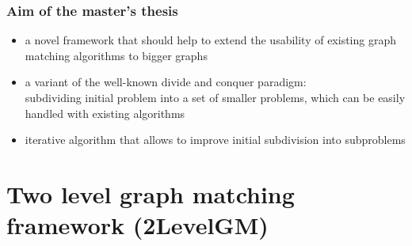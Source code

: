 \documentclass[handout]{beamer}
\begin{document}
\begin{frame}
\frametitle{Aim of the master's thesis}
\begin{itemize}
\item a novel framework that should help to extend the usability
of existing graph matching algorithms to bigger graphs
\item a variant of the well-known divide and conquer paradigm:\\
	subdividing initial problem into a set of smaller problems, which can be easily handled with existing algorithms
\item iterative algorithm that allows to improve initial subdivision into subproblems
\end{itemize}

\end{frame}
\section{Two level graph matching framework (2LevelGM)}
\end{document}
